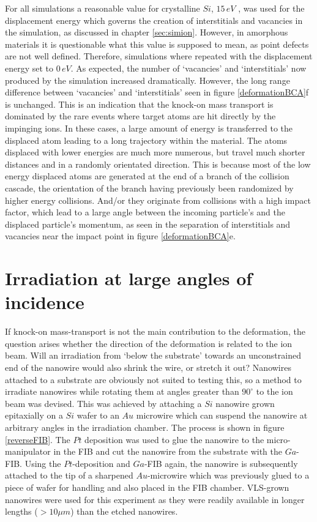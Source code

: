 For all simulations a reasonable value for crystalline $Si$, $15\,eV$ \cite{corbett_production_1965}, was used for the displacement energy which governs the creation of interstitials and vacancies in the simulation, as discussed in chapter \ref{sec:simion}. However, in amorphous materials it is questionable what this value is supposed to mean, as point defects are not well defined. Therefore, simulations where repeated with the displacement energy set to $0\,eV$. As expected, the number of `vacancies' and `interstitials' now produced by the simulation increased dramatically. However, the long range difference between `vacancies' and `interstitials' seen in figure \ref{deformationBCA}f is unchanged. This is an indication that the knock-on mass transport is dominated by the rare events where target atoms are hit directly by the impinging ions. In these cases, a large amount of energy is transferred to the displaced atom leading to a long trajectory within the material. The atoms displaced with lower energies are much more numerous, but travel much shorter distances and in a randomly orientated direction. This is because most of the low energy displaced atoms are generated at the end of a branch of the collision cascade, the orientation of the branch having previously been randomized by higher energy collisions. And/or they originate from collisions with a high impact factor, which lead to a large angle between the incoming particle's and the displaced particle's momentum, as seen in the separation of interstitials and vacancies near the impact point in figure \ref{deformationBCA}e.

\section{Irradiation at large angles of incidence}

If knock-on mass-transport is not the main contribution to the deformation, the question arises whether the direction of the deformation is related to the ion beam. Will an irradiation from `below the substrate' towards an unconstrained end of the nanowire would also shrink the wire, or stretch it out? Nanowires attached to a substrate are obviously not suited to testing this, so a method to irradiate nanowires while rotating them at angles greater than $90^\circ$ to the ion beam was devised. This was achieved by attaching a $Si$ nanowire grown epitaxially on a $Si$ wafer to an $Au$ microwire which can suspend the nanowire at arbitrary angles in the irradiation chamber. The process is shown in figure \ref{reverseFIB}. The $Pt$ deposition was used to glue the nanowire to the micro-manipulator in the FIB and cut the nanowire from the substrate with the $Ga$-FIB. Using the $Pt$-deposition and $Ga$-FIB again, the nanowire is subsequently attached to the tip of a sharpened $Au$-microwire which was previously glued to a piece of wafer for handling and also placed in the FIB chamber. VLS-grown nanowires were used for this experiment as they were readily available in longer lengths ($>10\mu m$) than the etched nanowires.

